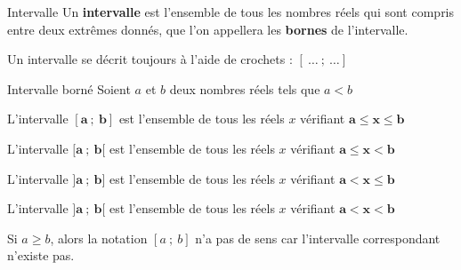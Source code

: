 \documentclass[oneside,12pt]{article}          %
\begin{document}
\begin{definition}{Intervalle}
	Un \textbf{intervalle} est l'ensemble de tous les nombres réels qui sont compris entre deux extrêmes donnés, que l'on appellera les \textbf{bornes} de l'intervalle.

	Un intervalle se décrit toujours à l'aide de crochets : $[~\ldots~;~\ldots]$
\end{definition}

\begin{definition}{Intervalle borné}
	Soient $a$ et $b$ deux nombres réels tels que $a<b$
    		
    	L'intervalle $\mathbold{ [a~;~b] }$ est l'ensemble de tous les réels $x$ vérifiant $\mathbold{ a \leq x \leq b }$ 
    		
    	L'intervalle $\mathbold{ [a~;~b[ }$ est l'ensemble de tous les réels $x$ vérifiant $\mathbold{ a \leq x < b }$ 
    		
    	L'intervalle $\mathbold{ ]a~;~b] }$ est l'ensemble de tous les réels $x$ vérifiant $\mathbold{ a < x \leq b }$ 
    		
    	L'intervalle $\mathbold{ ]a~;~b[ }$ est l'ensemble de tous les réels $x$ vérifiant $\mathbold{ a < x < b }$
\end{definition}
    

\begin{remarque}
    Si $a\geq b$, alors la notation $[a~;~b]$ n'a pas de sens car l'intervalle correspondant n'existe pas.
\end{remarque}
\end{document}
